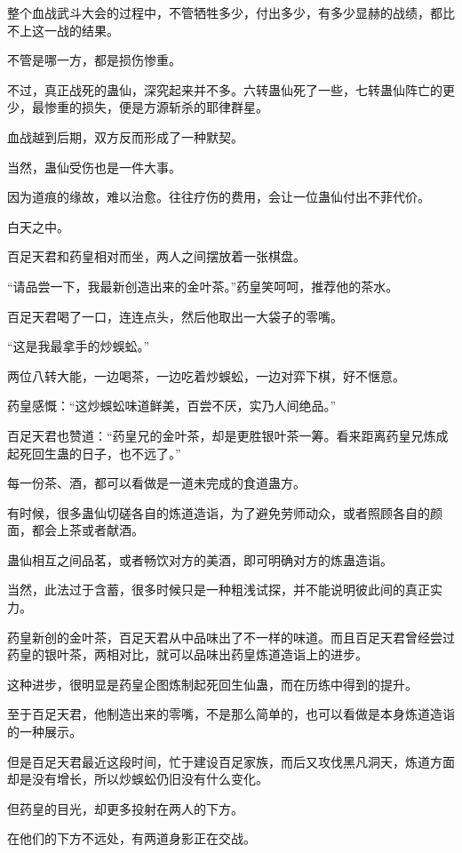 \begin{this_body}
整个血战武斗大会的过程中，不管牺牲多少，付出多少，有多少显赫的战绩，都比不上这一战的结果。

不管是哪一方，都是损伤惨重。

不过，真正战死的蛊仙，深究起来并不多。六转蛊仙死了一些，七转蛊仙阵亡的更少，最惨重的损失，便是方源斩杀的耶律群星。

血战越到后期，双方反而形成了一种默契。

当然，蛊仙受伤也是一件大事。

因为道痕的缘故，难以治愈。往往疗伤的费用，会让一位蛊仙付出不菲代价。

白天之中。

百足天君和药皇相对而坐，两人之间摆放着一张棋盘。

“请品尝一下，我最新创造出来的金叶茶。”药皇笑呵呵，推荐他的茶水。

百足天君喝了一口，连连点头，然后他取出一大袋子的零嘴。

“这是我最拿手的炒蜈蚣。”

两位八转大能，一边喝茶，一边吃着炒蜈蚣，一边对弈下棋，好不惬意。

药皇感慨：“这炒蜈蚣味道鲜美，百尝不厌，实乃人间绝品。”

百足天君也赞道：“药皇兄的金叶茶，却是更胜银叶茶一筹。看来距离药皇兄炼成起死回生蛊的日子，也不远了。”

每一份茶、酒，都可以看做是一道未完成的食道蛊方。

有时候，很多蛊仙切磋各自的炼道造诣，为了避免劳师动众，或者照顾各自的颜面，都会上茶或者献酒。

蛊仙相互之间品茗，或者畅饮对方的美酒，即可明确对方的炼蛊造诣。

当然，此法过于含蓄，很多时候只是一种粗浅试探，并不能说明彼此间的真正实力。

药皇新创的金叶茶，百足天君从中品味出了不一样的味道。而且百足天君曾经尝过药皇的银叶茶，两相对比，就可以品味出药皇炼道造诣上的进步。

这种进步，很明显是药皇企图炼制起死回生仙蛊，而在历练中得到的提升。

至于百足天君，他制造出来的零嘴，不是那么简单的，也可以看做是本身炼道造诣的一种展示。

但是百足天君最近这段时间，忙于建设百足家族，而后又攻伐黑凡洞天，炼道方面却是没有增长，所以炒蜈蚣仍旧没有什么变化。

但药皇的目光，却更多投射在两人的下方。

在他们的下方不远处，有两道身影正在交战。


\end{this_body}

